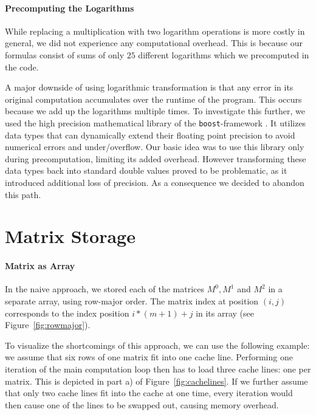 \documentclass{article}
\begin{document}
\paragraph{Precomputing the Logarithms}
While replacing a multiplication with two logarithm operations is more costly in general, we did not experience any computational overhead. This is because our formulas consist of sums of only $25$ different logarithms which we precomputed in the code.

A major downside of using logarithmic transformation is that any error in its original computation accumulates over the runtime of the program. This occurs because we add up the logarithms multiple times. To investigate this further, we used the high precision mathematical library of the \texttt{boost}-framework \cite{boost}. It utilizes data types that can dynamically extend their floating point precision to avoid numerical errors and under/overflow. Our basic idea was to use this library only during precomputation, limiting its added overhead. However transforming these data types back into standard double values proved to be problematic, as it introduced additional loss of precision. As a consequence we decided to abandon this path.

\section{Matrix Storage}
\label{sec:caching}

\paragraph{Matrix as Array}
In the naive approach, we stored each of the matrices $M^0, M^1$ and $M^2$ in a separate array, using row-major order. The matrix index at position $(i,j)$ corresponds to the index position $i*(m+1)+j$ in its array (see Figure~\ref{fig:rowmajor}).

To visualize the shortcomings of this approach, we can use the following example: we assume that six rows of one matrix fit into one cache line. Performing one iteration of the main computation loop then has to load three cache lines: one per matrix. This is depicted in part a) of Figure~\ref{fig:cachelines}.
If we further assume that only two cache lines fit into the cache at one time, every iteration would then cause one of the lines to be swapped out, causing memory overhead.
\end{document}

